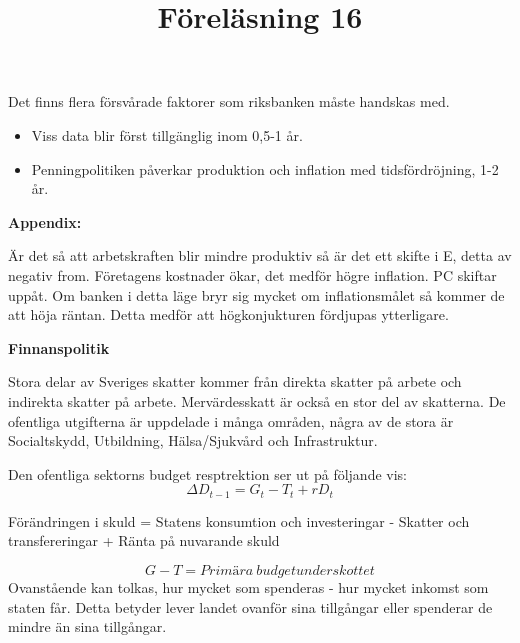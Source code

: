 \documentclass{article}
\begin{document}
\vspace{5mm} \par \noindent 

Det finns flera försvårade faktorer som riksbanken måste handskas med. 
\begin{itemize}
     \item Viss data blir först tillgänglig inom 0,5-1 år. 
     \item Penningpolitiken påverkar produktion och inflation med tidsfördröjning, 1-2 år. 
\end{itemize}

\textbf{Appendix: } \vspace{5mm} \par \noindent Är det så att arbetskraften blir mindre produktiv så är det ett skifte i E, detta av negativ from. Företagens kostnader ökar, det medför högre inflation. PC skiftar uppåt. Om banken i detta läge bryr sig mycket om inflationsmålet så kommer de att höja räntan. Detta medför att högkonjukturen fördjupas ytterligare. 
\vspace{5mm} \par \noindent 
\title{Föreläsning 16}
\vspace{5mm} \par \noindent 

\textbf{Finnanspolitik}

\vspace{5mm} \par \noindent 


Stora delar av Sveriges skatter kommer från direkta skatter på arbete och indirekta skatter på arbete. Mervärdesskatt är också en stor del av skatterna. De ofentliga utgifterna är uppdelade i många områden, några av de stora är Socialtskydd, Utbildning, Hälsa/Sjukvård och Infrastruktur. 

Den ofentliga sektorns budget resptrektion ser ut på följande vis: 
$$
\Delta D_{t-1} = G_t -T_t + rD_t 
$$

Förändringen i skuld = Statens konsumtion och investeringar - Skatter och transfereringar + Ränta på nuvarande skuld

$$
G-T = Primära \ budgetunderskottet 
$$
Ovanstående kan tolkas, hur mycket som spenderas - hur mycket inkomst som staten får. Detta betyder lever landet ovanför sina tillgångar eller spenderar de mindre än sina tillgångar. 

\vspace{5mm} \par \noindent 
\end{document}

